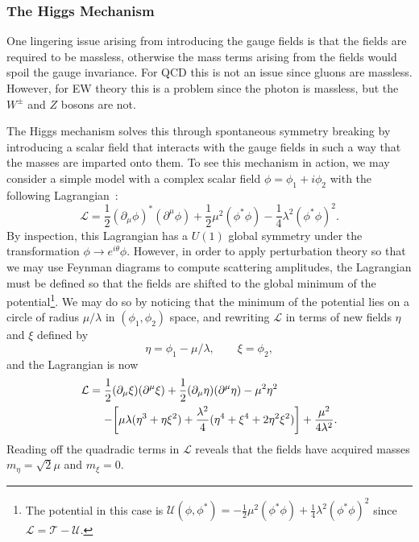 \subsubsection{The Higgs Mechanism}

One lingering issue arising from introducing the gauge fields is that the fields are required to be massless, otherwise the mass terms arising from the fields would spoil the gauge invariance.
For QCD this is not an issue since gluons are massless.
However, for EW theory this is a problem since the photon is massless, but the $W^\pm$ and $Z$ bosons are not.

The Higgs mechanism solves this through spontaneous symmetry breaking by introducing a scalar field that interacts with the gauge fields in such a way that the masses are imparted onto them.
To see this mechanism in action, we may consider a simple model with a complex scalar field $\phi=\phi_1+i\phi_2$ with the following Lagrangian~\cite{GriffithsParticle}:
\begin{equation}
  \mathcal{L}=\frac{1}{2}(\partial_\mu\phi)^*(\partial^\mu\phi)+\frac{1}{2}\mu^2(\phi^*\phi)-\frac{1}{4}\lambda^2(\phi^*\phi)^2.
\end{equation}
By inspection, this Lagrangian has a $U(1)$ global symmetry under the transformation $\phi\to e^{i\theta}\phi$.
However, in order to apply perturbation theory so that we may use Feynman diagrams to compute scattering amplitudes, the Lagrangian must be defined so that the fields are shifted to the global minimum of the potential\footnote{The potential in this case is $\mathcal{U}(\phi,\phi^*)=-\frac{1}{2}\mu^2(\phi^*\phi)+\frac{1}{4}\lambda^2(\phi^*\phi)^2$ since $\mathcal{L}=\mathcal{T}-\mathcal{U}$.}.
We may do so by noticing that the minimum of the potential lies on a circle of radius $\mu/\lambda$ in $(\phi_1,\phi_2)$ space, and rewriting $\mathcal{L}$ in terms of new fields $\eta$ and $\xi$ defined by
\begin{equation}\label{eq:fields}
  \eta=\phi_1-\mu/\lambda,\qquad \xi=\phi_2,
\end{equation}
and the Lagrangian is now
\begin{equation}
  \begin{aligned}
    \mathcal{L} &= \frac{1}{2}(\partial_\mu\xi)(\partial^\mu\xi)+\frac{1}{2}(\partial_\mu\eta)(\partial^\mu\eta)-\mu^2\eta^2\\
    &\equad- \bqty{\mu\lambda(\eta^3+\eta\xi^2)+\frac{\lambda^2}{4}(\eta^4+\xi^4+2\eta^2\xi^2)}+\frac{\mu^2}{4\lambda^2}.
  \end{aligned}
\end{equation}
Reading off the quadradic terms in $\mathcal{L}$ reveals that the fields have acquired masses $m_\eta=\sqrt{2}\mu$ and $m_\xi=0$.

